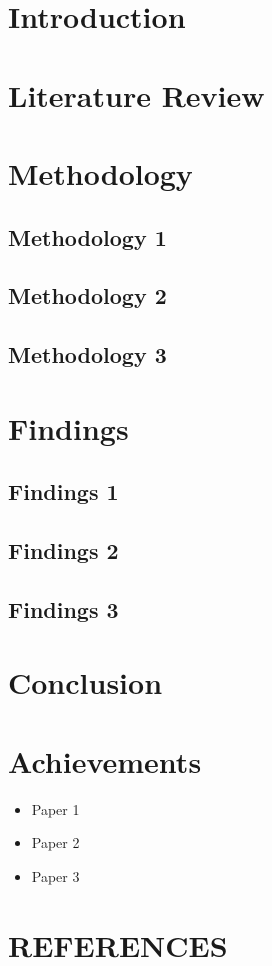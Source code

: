 \documentclass{article}
\begin{document}
\newpage


\section{Introduction}
\lipsum[1-3]

\newpage

\section{Literature Review}
\lipsum[1-4]\cite{7004542}


\newpage

\section{Methodology}
\lipsum[1]
\subsection{Methodology 1}
\subsection{Methodology 2}
\subsection{Methodology 3}




\section{Findings}
\subsection{Findings 1}
\subsection{Findings 2}
\subsection{Findings 3}

\section{Conclusion}
\lipsum[1-3]

\section{Achievements}
\lipsum[1]
\begin{itemize}
    \item [i)]  Paper 1
    \item [ii)]  Paper 2
    \item [iii)]  Paper 3
\end{itemize}

\newpage
\section*{REFERENCES}


\renewcommand{\bibname}{References}

\end{document}
